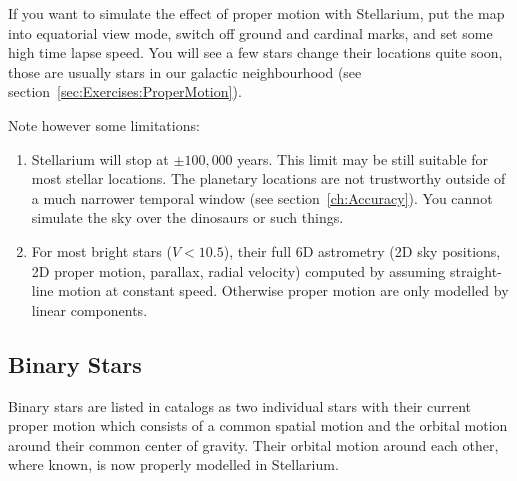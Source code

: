 If you want to simulate the effect of proper motion with Stellarium,
put the map into equatorial view mode, switch off ground and cardinal
marks, and set some high time lapse speed. You will see a few stars
change their locations quite soon, those are usually stars in our
galactic neighbourhood (see section~\ref{sec:Exercises:ProperMotion}).

Note however some limitations:
\begin{enumerate}
\item Stellarium will stop at $\pm 100,000$ years. This limit may be
  still suitable for most stellar locations. The planetary locations
  are not trustworthy outside of a much narrower temporal window (see
  section~\ref{ch:Accuracy}). You cannot simulate the sky over the
  dinosaurs or such things.
\item For most bright stars ($V<10.5$), their full 6D astrometry (2D sky positions, 
  2D proper motion, parallax, radial velocity) computed by assuming straight-line motion at constant speed. 
  Otherwise proper motion are only modelled by linear components.
\end{enumerate}

\subsection{Binary Stars}

Binary stars are listed in catalogs as two individual stars with
their current proper motion which consists of a common spatial motion and the 
orbital motion around their common center of gravity. Their orbital
motion around each other, where known, is now properly modelled in Stellarium. 

